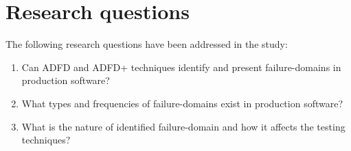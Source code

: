 \documentclass[runningheads,a4paper]{llncs}
\begin{document}
\section{Research questions} \label{sec:questions}
The following research questions have been addressed in the study:
\begin{enumerate}
%
\item Can ADFD and ADFD+ techniques identify and present failure-domains in production software? %

%
%
\item What types and frequencies of failure-domains exist in production software? %
%
\item What is the nature of identified failure-domain and how it affects the testing techniques? %

%


\end{enumerate}
\end{document}
